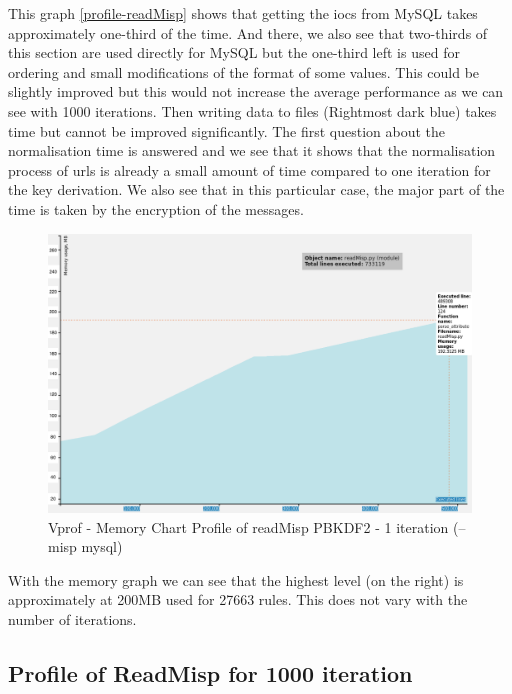 \documentclass{eplmastersthesis}
\begin{document}
This graph \ref{profile-readMisp} shows that getting the \glspl{ioc} from MySQL takes approximately one-third of the time. And there, we also see that two-thirds of this section are used directly for MySQL but the one-third left is used for ordering and small modifications of the format of some values. This could be slightly improved but this would not increase the average performance as we can see with 1000 iterations.
Then writing data to files (Rightmost dark blue) takes time but cannot be improved significantly.
The first question about the normalisation time is answered and we see that it shows that the normalisation process of \glspl{url} is already a small amount of time compared to one iteration for the key derivation.
We also see that in this particular case, the major part of the time is taken by the encryption of the messages.\\

\begin{figure}[h!]
\begin{center}
	\includegraphics[scale=0.3]{res/profile-mem-readMisp-1iter}
	\caption{Vprof - Memory Chart Profile of readMisp PBKDF2 - 1 iteration (--misp mysql)}
	\label{profile-mem-readMisp}
\end{center}
\end{figure}

With the memory graph we can see that the highest level (on the right) is approximately at 200MB used for 27663 rules. This does not vary with the number of iterations.\\ 

\subsection{Profile of ReadMisp for 1000 iteration}
\end{document}
